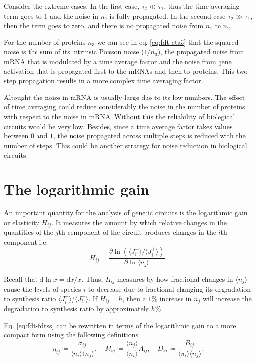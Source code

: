 Consider the extreme cases. In the first case, $\tau_2\ll\tau_1$, thus the time averaging term goes to $1$ and the noise in $n_1$ is fully propagated. In the second case $\tau_2\gg\tau_1$, then the term goes to zero, and there is no propagated noise from $n_1$ to $n_2$.

For the number of proteins $n_3$ we can see in eq. \eqref{eq:fdt-eta3} that the squared noise is the sum of its intrinsic Poisson noise ($1/n_3$), the propagated noise from mRNA that is modulated by a time average factor and the noise from gene activation that is propagated first to the mRNAs and then to proteins. This two-step propagation results in a more complex time averaging factor.

Altought the noise in mRNA is usually large due to its low numbers. The effect of time averaging could reduce considerably the noise in the number of proteins with respect to the noise in mRNA. Without this the reliability of biological circuits would be very low. Besides, since a time average factor takes values between $0$ and $1$, the noise propagated across multiple steps is reduced with the number of steps. This could be another strategy for noise reduction in biological circuits.

\section{The logarithmic gain}
\label{sec:log_gain}
An important quantity for the analysis of genetic circuits is the logarithmic gain or elasticity $H_{ij}$. It measures the amount by which relative changes in the quantities of the $j$th component of the circuit produces changes in the $i$th component i.e.
\begin{equation}
  \label{eq:fdt-def_H}
  H_{ij} = \frac{\partial \ln (\langle J_i^-\rangle/\langle J_i^+\rangle)}{\partial \ln \langle n_j\rangle}.
\end{equation}

Recall that $\mathrm{d}\ln x = \mathrm{d}x/x$. Thus, $H_{ij}$ measures by how fractional changes in $\langle n_j\rangle$ cause the levels of species $i$ to decrease due to fractional changing its degradation to synthesis ratio $\langle J_i^+\rangle/\langle J_i^-\rangle$. If $H_{ij} = h$, then a $1\%$ increase in $n_j$ will increase the degradation to synthesis ratio by approximately $h\%$.

Eq. \eqref{eq:fdt-fdtss} can be rewritten in terms of the logarithmic gain to a more compact form using the following definitions
\begin{equation*}
  \eta_{ij}\coloneqq\frac{\sigma_{ij}}{\langle n_i\rangle\langle n_j\rangle}, \quad M_{ij}\coloneqq\frac{\langle n_j\rangle}{\langle n_i\rangle}A_{ij}, \quad D_{ij}\coloneqq\frac{B_{ij}}{\langle n_i\rangle\langle n_j\rangle}.
\end{equation*}

